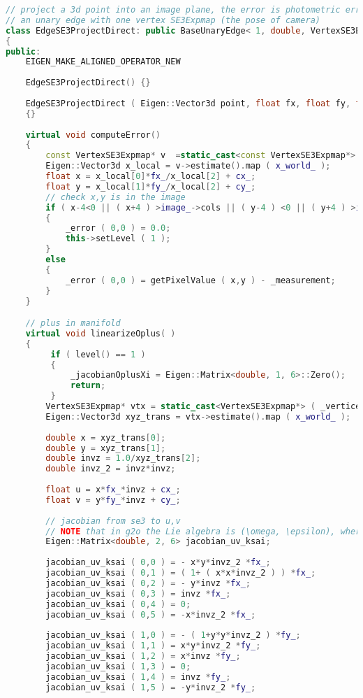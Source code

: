 \begin{lstlisting}[language=c++,caption=slambook/ch8/directMethod/direct\_sparse.cpp（片段）]
// project a 3d point into an image plane, the error is photometric error
// an unary edge with one vertex SE3Expmap (the pose of camera)
class EdgeSE3ProjectDirect: public BaseUnaryEdge< 1, double, VertexSE3Expmap>
{
public:
	EIGEN_MAKE_ALIGNED_OPERATOR_NEW
	
	EdgeSE3ProjectDirect() {}
	
	EdgeSE3ProjectDirect ( Eigen::Vector3d point, float fx, float fy, float cx, float cy, cv::Mat* image ) : x_world_ ( point ), fx_ ( fx ), fy_ ( fy ), cx_ ( cx ), cy_ ( cy ), image_ ( image )
	{}
	
	virtual void computeError()
	{
		const VertexSE3Expmap* v  =static_cast<const VertexSE3Expmap*> ( _vertices[0] );
		Eigen::Vector3d x_local = v->estimate().map ( x_world_ );
		float x = x_local[0]*fx_/x_local[2] + cx_;
		float y = x_local[1]*fy_/x_local[2] + cy_;
		// check x,y is in the image
		if ( x-4<0 || ( x+4 ) >image_->cols || ( y-4 ) <0 || ( y+4 ) >image_->rows )
		{
			_error ( 0,0 ) = 0.0;
			this->setLevel ( 1 );
		}
		else
		{
			_error ( 0,0 ) = getPixelValue ( x,y ) - _measurement;
		}
	}

	// plus in manifold
	virtual void linearizeOplus( )
	{
	     if ( level() == 1 )
	     {
		     _jacobianOplusXi = Eigen::Matrix<double, 1, 6>::Zero();
		     return;
	     }
		VertexSE3Expmap* vtx = static_cast<VertexSE3Expmap*> ( _vertices[0] );
		Eigen::Vector3d xyz_trans = vtx->estimate().map ( x_world_ );   // q in book
		
		double x = xyz_trans[0];
		double y = xyz_trans[1];
		double invz = 1.0/xyz_trans[2];
		double invz_2 = invz*invz;
		
		float u = x*fx_*invz + cx_;
		float v = y*fy_*invz + cy_;
		
		// jacobian from se3 to u,v
		// NOTE that in g2o the Lie algebra is (\omega, \epsilon), where \omega is so(3) and \epsilon the translation
		Eigen::Matrix<double, 2, 6> jacobian_uv_ksai;
		
		jacobian_uv_ksai ( 0,0 ) = - x*y*invz_2 *fx_;
		jacobian_uv_ksai ( 0,1 ) = ( 1+ ( x*x*invz_2 ) ) *fx_;
		jacobian_uv_ksai ( 0,2 ) = - y*invz *fx_;
		jacobian_uv_ksai ( 0,3 ) = invz *fx_;
		jacobian_uv_ksai ( 0,4 ) = 0;
		jacobian_uv_ksai ( 0,5 ) = -x*invz_2 *fx_;
		
		jacobian_uv_ksai ( 1,0 ) = - ( 1+y*y*invz_2 ) *fy_;
		jacobian_uv_ksai ( 1,1 ) = x*y*invz_2 *fy_;
		jacobian_uv_ksai ( 1,2 ) = x*invz *fy_;
		jacobian_uv_ksai ( 1,3 ) = 0;
		jacobian_uv_ksai ( 1,4 ) = invz *fy_;
		jacobian_uv_ksai ( 1,5 ) = -y*invz_2 *fy_;
		

\end{lstlisting}
